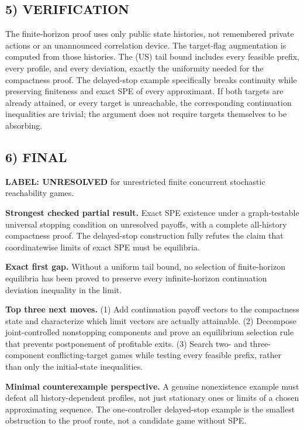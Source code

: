 \documentclass[11pt,a4paper]{article}
\theoremstyle{definition}
\theoremstyle{remark}
\begin{document}
\subsection*{5) VERIFICATION}
The finite-horizon proof uses only public state histories, not remembered private actions or an unannounced correlation device. The target-flag augmentation is computed from those histories. The (US) tail bound includes every feasible prefix, every profile, and every deviation, exactly the uniformity needed for the compactness proof. The delayed-stop example specifically breaks continuity while preserving finiteness and exact SPE of every approximant. If both targets are already attained, or every target is unreachable, the corresponding continuation inequalities are trivial; the argument does not require targets themselves to be absorbing.

\subsection*{6) FINAL}
\textbf{LABEL: UNRESOLVED} for unrestricted finite concurrent stochastic reachability games.

\textbf{Strongest checked partial result.} Exact SPE existence under a graph-testable universal stopping condition on unresolved payoffs, with a complete all-history compactness proof. The delayed-stop construction fully refutes the claim that coordinatewise limits of exact SPE must be equilibria.

\textbf{Exact first gap.} Without a uniform tail bound, no selection of finite-horizon equilibria has been proved to preserve every infinite-horizon continuation deviation inequality in the limit.

\textbf{Top three next moves.} (1) Add continuation payoff vectors to the compactness state and characterize which limit vectors are actually attainable. (2) Decompose joint-controlled nonstopping components and prove an equilibrium selection rule that prevents postponement of profitable exits. (3) Search two- and three-component conflicting-target games while testing every feasible prefix, rather than only the initial-state inequalities.

\textbf{Minimal counterexample perspective.} A genuine nonexistence example must defeat all history-dependent profiles, not just stationary ones or limits of a chosen approximating sequence. The one-controller delayed-stop example is the smallest obstruction to the proof route, not a candidate game without SPE.
\end{document}
